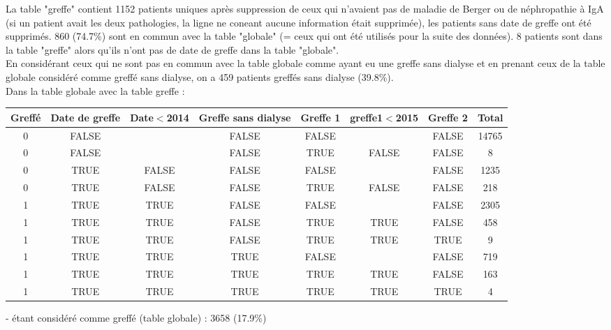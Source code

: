 \documentclass[11pt,a4paper]{article}\usepackage[]{graphicx}\usepackage[]{color}
\begin{document}
La table "greffe" contient 1152 patients uniques après suppression de ceux qui n'avaient pas de maladie de Berger ou de néphropathie à IgA (si un patient avait les deux pathologies, la ligne ne coneant aucune information était supprimée), les patients sans date de greffe ont été supprimés. 860 (74.7\%) sont en commun avec la table "globale" (= ceux qui ont été utilisés pour la suite des données). 8 patients sont dans la table "greffe" alors qu'ils n'ont pas de date de greffe dans la table "globale".
~\\

En considérant ceux qui ne sont pas en commun avec la table globale comme ayant eu une greffe sans dialyse et en prenant ceux de la table globale considéré comme greffé sans dialyse, on a 459 patients greffés sans dialyse (39.8\%).
~\\

Dans la table globale avec la table greffe :

\begin{table}[H]
\centering
\begin{tabular}{cccccccc}
  \hline
Greffé & Date de greffe & Date$<$2014 & Greffe sans dialyse & Greffe 1 & greffe1$<$2015 & Greffe 2 & Total \\ 
  \hline
0 & FALSE &  & FALSE & FALSE &  & FALSE & 14765 \\ 
  0 & FALSE &  & FALSE & TRUE & FALSE & FALSE & 8 \\ 
  0 & TRUE & FALSE & FALSE & FALSE &  & FALSE & 1235 \\ 
  0 & TRUE & FALSE & FALSE & TRUE & FALSE & FALSE & 218 \\ 
  1 & TRUE & TRUE & FALSE & FALSE &  & FALSE & 2305 \\ 
  1 & TRUE & TRUE & FALSE & TRUE & TRUE & FALSE & 458 \\ 
  1 & TRUE & TRUE & FALSE & TRUE & TRUE & TRUE & 9 \\ 
  1 & TRUE & TRUE & TRUE & FALSE &  & FALSE & 719 \\ 
  1 & TRUE & TRUE & TRUE & TRUE & TRUE & FALSE & 163 \\ 
  1 & TRUE & TRUE & TRUE & TRUE & TRUE & TRUE & 4 \\ 
   \hline
\end{tabular}
\end{table}


- étant considéré comme greffé (table globale) : 3658 (17.9\%)
\end{document}
